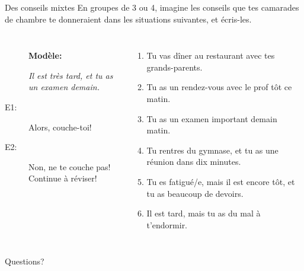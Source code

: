 \documentclass{beamer}
\begin{document}
  \begin{frame}{Des conseils mixtes}
    \small
    En groupes de 3 ou 4, imagine les conseils que tes camarades de chambre te donneraient dans les situations suivantes, et écris-les.\\
    \begin{columns}
        \begin{description}
          \item[] \textbf{Modèle:}
          \item[] \emph{Il est très tard, et tu as un examen demain.}
          \item[E1:] Alors, couche-toi!
          \item[] 
          \item[E2:] Non, ne te couche pas! Continue à réviser!
          \item[] 
        \end{description}
        \scriptsize
        \begin{enumerate}
          \item Tu vas dîner au restaurant avec tes grands-parents.
          \item Tu as un rendez-vous avec le prof tôt ce matin.
          \item Tu as un examen important demain matin.
          \item Tu rentres du gymnase, et tu as une réunion dans dix minutes.
          \item Tu es fatigué/e, mais il est encore tôt, et tu as beaucoup de devoirs.
          \item Il est tard, mais tu as du mal à t'endormir.
        \end{enumerate}
    \end{columns}
  \end{frame}

  \begin{frame}{}
    \begin{center}
      \Large Questions?
    \end{center}
  \end{frame}
\end{document}
